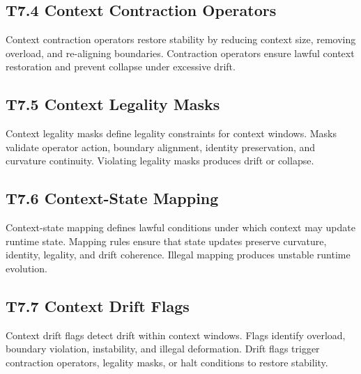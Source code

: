 \subsection{T7.4 Context Contraction Operators}
Context contraction operators restore stability by reducing context size,
removing overload, and re-aligning boundaries. Contraction operators ensure
lawful context restoration and prevent collapse under excessive drift.

\subsection{T7.5 Context Legality Masks}
Context legality masks define legality constraints for context windows. Masks
validate operator action, boundary alignment, identity preservation, and
curvature continuity. Violating legality masks produces drift or collapse.

\subsection{T7.6 Context-State Mapping}
Context-state mapping defines lawful conditions under which context may update
runtime state. Mapping rules ensure that state updates preserve curvature,
identity, legality, and drift coherence. Illegal mapping produces unstable
runtime evolution.

\subsection{T7.7 Context Drift Flags}
Context drift flags detect drift within context windows. Flags identify overload,
boundary violation, instability, and illegal deformation. Drift flags trigger
contraction operators, legality masks, or halt conditions to restore stability.
